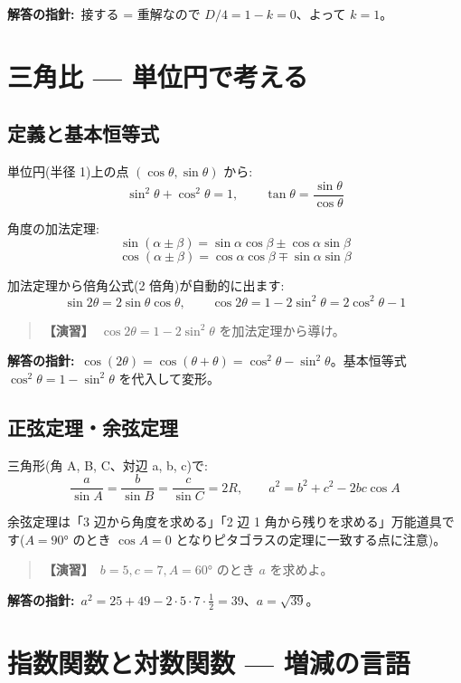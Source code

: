 \documentclass{article}
\begin{document}
\textbf{解答の指針:}\ 接する = 重解なので \(D/4 = 1 - k = 0\)、よって \(k = 1\)。

\section{三角比 — 単位円で考える}

\subsection{定義と基本恒等式}

単位円(半径 1)上の点 \((\cos\theta, \sin\theta)\) から:
\[ \sin^2\theta + \cos^2\theta = 1, \qquad \tan\theta = \frac{\sin\theta}{\cos\theta} \]

角度の加法定理:
\[ \sin(\alpha \pm \beta) = \sin\alpha\cos\beta \pm \cos\alpha\sin\beta \]
\[ \cos(\alpha \pm \beta) = \cos\alpha\cos\beta \mp \sin\alpha\sin\beta \]

加法定理から倍角公式(2 倍角)が自動的に出ます:
\[ \sin 2\theta = 2\sin\theta\cos\theta, \qquad \cos 2\theta = 1 - 2\sin^2\theta = 2\cos^2\theta - 1 \]

\begin{quote}
\textbf{【演習】}\ \(\cos 2\theta = 1 - 2\sin^2\theta\) を加法定理から導け。
\end{quote}

\textbf{解答の指針:}\ \(\cos(2\theta) = \cos(\theta + \theta) = \cos^2\theta - \sin^2\theta\)。基本恒等式 \(\cos^2\theta = 1 - \sin^2\theta\) を代入して変形。

\subsection{正弦定理・余弦定理}

三角形(角 A, B, C、対辺 a, b, c)で:
\[ \frac{a}{\sin A} = \frac{b}{\sin B} = \frac{c}{\sin C} = 2R, \qquad a^2 = b^2 + c^2 - 2bc\cos A \]

余弦定理は「3 辺から角度を求める」「2 辺 1 角から残りを求める」万能道具です(\(A = 90°\) のとき \(\cos A = 0\) となりピタゴラスの定理に一致する点に注意)。

\begin{quote}
\textbf{【演習】}\ \(b = 5, c = 7, A = 60°\) のとき \(a\) を求めよ。
\end{quote}

\textbf{解答の指針:}\ \(a^2 = 25 + 49 - 2 \cdot 5 \cdot 7 \cdot \frac{1}{2} = 39\)、\(a = \sqrt{39}\)。

\section{指数関数と対数関数 — 増減の言語}
\end{document}
